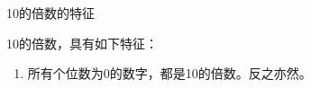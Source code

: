 \documentclass[aspectratio=169]{ctexbeamer} %
\date{\today}
\begin{document}
\begin{frame}[t]{10的倍数的特征}
\begin{spacing}{1.2}
\normalsize
10的倍数，具有如下特征：
\begin{enumerate}[label={\arabic*.}]
\item \alert{所有个位数为0的数字，都是10的倍数。反之亦然。}
\end{enumerate}

\end{spacing}
\end{frame}
\end{document}
